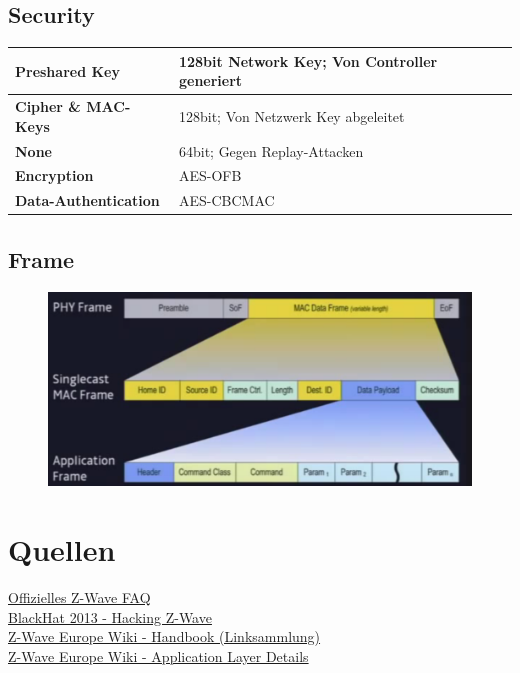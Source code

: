 \documentclass[a4paper,11pt]{article}
\begin{document}
\subsection*{Security}
\begin{tabular}{| p{3.5cm} | p{10cm} |}
	\hline
	\textbf{Preshared Key} & 128bit Network Key; Von Controller generiert\\\hline
	\textbf{Cipher \& MAC-Keys} & 128bit; Von Netzwerk Key abgeleitet\\\hline
	\textbf{None} & 64bit; Gegen Replay-Attacken\\\hline
	\textbf{Encryption} & AES-OFB\\\hline
	\textbf{Data-Authentication} & AES-CBCMAC\\\hline
\end{tabular}

\subsection*{Frame}
\begin{figure}[h!t]
	\includegraphics{images/frame.png}
\end{figure}

\section*{Quellen}

\href{http://www.z-wave.com/faq}{Offizielles Z-Wave FAQ}\\
\href{https://www.youtube.com/watch?v=KYaEQhvodc8}{BlackHat 2013 - Hacking Z-Wave}\\
\href{http://wiki.zwaveeurope.com/index.php?title=Z-Wave_Technical_Handbook}{Z-Wave Europe Wiki - Handbook (Linksammlung)}\\
\href{http://wiki.zwaveeurope.com/index.php?title=Z-Wave_Application_Layer}{Z-Wave Europe Wiki - Application Layer Details}
\end{document}
